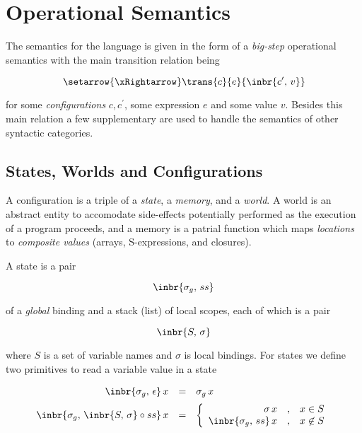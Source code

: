\section{Operational Semantics}

The semantics for the language is given in the form of a \emph{big-step} operational semantics with the
main transition relation being

\[
\setarrow{\xRightarrow}
\trans{c}{e}{\inbr{c^\prime,\,v}}
\]

for some \emph{configurations} $c, c^\prime$, some expression $e$ and some value $v$. Besides this main relation a few supplementary are
used to handle the semantics of other syntactic categories.

\subsection{States, Worlds and Configurations}

A configuration is a triple of a \emph{state}, a \emph{memory}, and a \emph{world}. A world is an abstract entity to accomodate side-effects
potentially performed as the execution of a program proceeds, and a memory is a patrial function which maps \emph{locations} to
\emph{composite values} (arrays, S-expressions, and closures).

A state is a pair

\[
\inbr{\sigma_g,\,ss}
\]

of a \emph{global} binding and a stack (list) of local scopes, each of which is a pair

\[
\inbr{S,\,\sigma}
\]

where $S$ is a set of variable names and $\sigma$ is local bindings. For states we define two primitives to read a variable
value in a state 


\[
\begin{array}{rcl}
  \inbr{\sigma_g,\,\epsilon}\,x & = &\sigma_g\,x\\[2mm]
  \inbr{\sigma_g,\,\inbr{S,\,\sigma}\circ ss}\,x  & = & \left\{\begin{array}{rcl}
                                                                  \sigma\,x &,& x\in S\\
                                                                  \inbr{\sigma_g,\,ss}\,x &,&x\not\in S
                                                               \end{array}
                                                        \right.
\end{array}
\]

